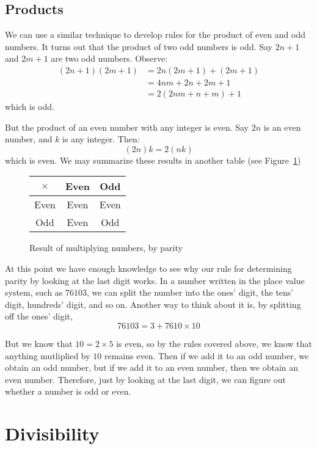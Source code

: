 \documentclass[a4paper,10pt]{report}
\begin{document}
\subsection{Products}

We can use a similar technique to develop rules for the product of even and odd
numbers. It turns out that the product of two odd numbers is odd. Say \(2n+1\)
and \(2m+1\) are two odd numbers. Observe: \begin{align*}
 (2n+1)(2m+1)
 &= 2n(2m+1) + (2m+1) \\
 &= 4nm+2n+2m+1 \\
 &= 2(2nm+n+m) + 1
\end{align*} which is odd.

But the product of an even number with any integer is even. Say \(2n\) is an
even number, and \(k\) is any integer. Then: \[
 (2n)k = 2(nk)
\] which is even. We may summarize these results in another table (see
Figure~\ref{pd:pprodt})

\begin{figure}
 \begin{tabular}{c|cc}
  \(\times\) & Even & Odd  \\
  \hline
  Even   & Even & Even \\
  Odd    & Even & Odd
 \end{tabular}

 \caption{Result of multiplying numbers, by parity}
 \label{pd:pprodt}
\end{figure}

At this point we have enough knowledge to see why our rule for determining
parity by looking at the last digit works. In a number written in the place
value system, such as \(76103\), we can split the number into the ones' digit,
the tens' digit, hundreds' digit, and so on. Another way to think about it is,
by splitting off the ones' digit, \[
 76103 = 3 + 7610 \times 10
\]

But we know that \(10=2\times5\) is even, so by the rules covered above, we
know that anything mutliplied by \(10\) remains even. Then if we add it to an
odd number, we obtain an odd number, but if we add it to an even number, then
we obtain an even number. Therefore, just by looking at the last digit, we can
figure out whether a number is odd or even.

\section{Divisibility}
\end{document}
